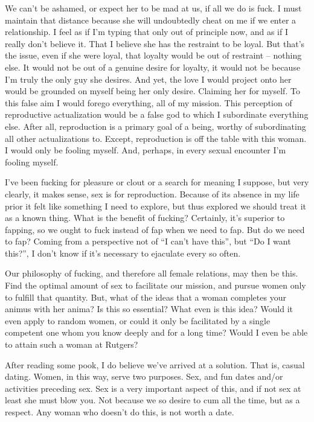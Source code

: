 \qquad We can't be ashamed, or expect her to be mad at us, if all we do
is fuck. I must maintain that distance because she will undoubtedly
cheat on me if we enter a relationship. I feel as if I'm typing that
only out of principle now, and as if I really don't believe it. That I
believe she has the restraint to be loyal. But that's the issue, even if
she were loyal, that loyalty would be out of restraint -- nothing else.
It would not be out of a genuine desire for loyalty, it would not be
because I'm truly the only guy she desires. And yet, the love I would
project onto her would be grounded on myself being her only desire.
Claiming her for myself. To this false aim I would forego everything,
all of my mission. This perception of reproductive actualization would
be a false god to which I subordinate everything else. After all,
reproduction is a primary goal of a being, worthy of subordinating all
other actualizations to. Except, reproduction is off the table with this
woman. I would only be fooling myself. And, perhaps, in every sexual
encounter I'm fooling myself.

\qquad I've been fucking for pleasure or clout or a search for meaning I
suppose, but very clearly, it makes sense, sex is for reproduction.
Because of its absence in my life prior it felt like something I need to
explore, but thus explored we should treat it as a known thing. What is
the benefit of fucking? Certainly, it's superior to fapping, so we ought
to fuck instead of fap when we need to fap. But do we need to fap?
Coming from a perspective not of ``I can't have this'', but ``Do I want
this?'', I don't know if it's necessary to ejaculate every so often.

\qquad Our philosophy of fucking, and therefore all female relations,
may then be this. Find the optimal amount of sex to facilitate our
mission, and pursue women only to fulfill that quantity. But, what of
the ideas that a woman completes your animus with her anima? Is this so
essential? What even is this idea? Would it even apply to random women,
or could it only be facilitated by a single competent one whom you know
deeply and for a long time? Would I even be able to attain such a woman
at Rutgers?

\qquad After reading some pook, I do believe we've arrived at a
solution. That is, casual dating. Women, in this way, serve two
purposes. Sex, and fun dates and/or activities preceding sex. Sex is a
very important aspect of this, and if not sex at least she must blow
you. Not because we so desire to cum all the time, but as a respect. Any
woman who doesn't do this, is not worth a date.


